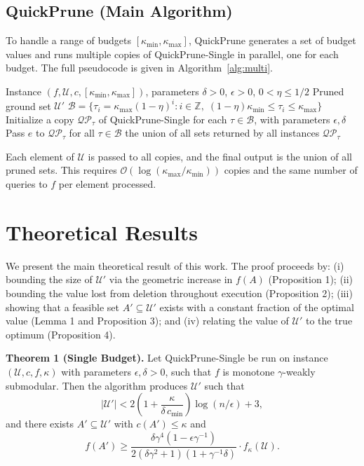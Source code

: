 \subsection{QuickPrune (Main Algorithm)}

To handle a range of budgets $[\kappa_{\min}, \kappa_{\max}]$, QuickPrune generates a set
of budget values and runs multiple copies of QuickPrune-Single in parallel, one for each
budget. The full pseudocode is given in Algorithm~\ref{alg:multi}.

\begin{algorithm}[t]
\caption{QuickPrune: The main pruning algorithm.}
\label{alg:multi}
\begin{algorithmic}[1]
\REQUIRE Instance $(f, \mathcal{U}, c, [\kappa_{\min}, \kappa_{\max}])$, parameters
  $\delta > 0$, $\epsilon > 0$, $0 < \eta \leq 1/2$
\ENSURE Pruned ground set $\mathcal{U}'$
\STATE $\mathcal{B} = \{\tau_i = \kappa_{\max}(1 - \eta)^i :
  i \in \mathbb{Z}, \; (1 - \eta)\kappa_{\min} \leq \tau_i \leq \kappa_{\max}\}$
\STATE Initialize a copy $\mathcal{QP}_\tau$ of QuickPrune-Single for each
  $\tau \in \mathcal{B}$, with parameters $\epsilon, \delta$
  \STATE Pass $e$ to $\mathcal{QP}_\tau$ for all $\tau \in \mathcal{B}$
\ENDFOR
\RETURN the union of all sets returned by all instances $\mathcal{QP}_\tau$
\end{algorithmic}
\end{algorithm}

Each element of $\mathcal{U}$ is passed to all copies, and the final output is the union
of all pruned sets. This requires
$\mathcal{O}(\log(\kappa_{\max} / \kappa_{\min}))$ copies and the same number of queries
to $f$ per element processed.

\section{Theoretical Results}

We present the main theoretical result of this work. The proof proceeds by: (i) bounding
the size of $\mathcal{U}'$ via the geometric increase in $f(A)$ (Proposition 1);
(ii) bounding the value lost from deletion throughout execution (Proposition 2);
(iii) showing that a feasible set $A' \subseteq \mathcal{U}'$ exists with a constant
fraction of the optimal value (Lemma 1 and Proposition 3); and (iv) relating the value of
$\mathcal{U}'$ to the true optimum (Proposition 4).

\textbf{Theorem 1 (Single Budget).}\label{thm:single} Let QuickPrune-Single be run on instance
$(\mathcal{U}, c, f, \kappa)$ with parameters $\epsilon, \delta > 0$, such that $f$ is
monotone $\gamma$-weakly submodular. Then the algorithm produces $\mathcal{U}'$ such that
\[
|\mathcal{U}'| < 2\left(1 + \frac{\kappa}{\delta \, c_{\min}}\right)
\log(n / \epsilon) + 3,
\]
and there exists $A' \subseteq \mathcal{U}'$ with $c(A') \leq \kappa$ and
\[
f(A') \geq \frac{\delta \gamma^4 (1 - \epsilon \gamma^{-1})}
{2(\delta \gamma^2 + 1)(1 + \gamma^{-1} \delta)} \cdot f_{\kappa}(\mathcal{U}).
\]

